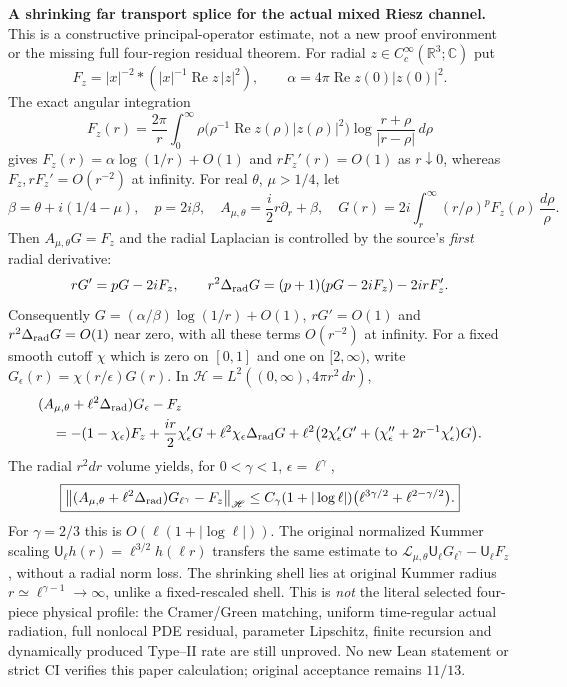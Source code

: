 
\par\medskip
\noindent\textbf{A shrinking far transport splice for the actual mixed Riesz channel.}
This is a constructive principal-operator estimate, not a new proof
environment or the missing full four-region residual theorem.
For radial $z\in C_c^\infty(\mathbb R^3;\mathbb C)$ put
\[
 F_z=|x|^{-2}*(|x|^{-1}\operatorname{Re}z\,|z|^2),
 \qquad \alpha=4\pi\operatorname{Re}z(0)|z(0)|^2.
\]
The exact angular integration
\[
 F_z(r)=\frac{2\pi}{r}\int_0^\infty
  \rho\bigl(\rho^{-1}\operatorname{Re}z(\rho)|z(\rho)|^2\bigr)
  \log\frac{r+\rho}{|r-\rho|}\,d\rho
\]
gives $F_z(r)=\alpha\log(1/r)+O(1)$ and $rF_z'(r)=O(1)$
as $r\downarrow0$, whereas $F_z,rF_z'=O(r^{-2})$ at infinity.
For real $\theta$, $\mu>1/4$, let
\[
 \beta=\theta+i(1/4-\mu),\quad p=2i\beta,\quad
 A_{\mu,\theta}=\frac i2r\partial_r+\beta,\quad
 G(r)=2i\int_r^\infty(r/\rho)^pF_z(\rho)\,\frac{d\rho}{\rho}.
\]
Then $A_{\mu,\theta}G=F_z$ and the radial Laplacian is
controlled by the source's \emph{first} radial derivative:
\[
 rG'=pG-2iF_z,\qquad
 r^2\Delta_{\rm rad}G=(p+1)(pG-2iF_z)-2irF_z'.
\]
Consequently $G= (\alpha/\beta)\log(1/r)+O(1)$,
$rG'=O(1)$ and $r^2\Delta_{\rm rad}G=O(1)$ near zero,
with all these terms $O(r^{-2})$ at infinity.
For a fixed smooth cutoff $\chi$ which is zero on $[0,1]$ and
one on $[2,\infty)$, write
$G_\epsilon(r)=\chi(r/\epsilon)G(r)$.
In $\mathscr H=L^2((0,\infty),4\pi r^2\,dr)$,
\[
 \begin{aligned}
 &(A_{\mu,\theta}+\ell^2\Delta_{\rm rad})G_\epsilon-F_z\\
 &\quad=-(1-\chi_\epsilon)F_z
    +\frac{ir}{2}\chi_\epsilon'G+
      \ell^2\chi_\epsilon\Delta_{\rm rad}G+
      \ell^2\bigl(2\chi_\epsilon'G'
       +(\chi_\epsilon''+2r^{-1}\chi_\epsilon')G\bigr).
 \end{aligned}
\]
The radial $r^2dr$ volume yields, for $0<\gamma<1$,
$\epsilon=\ell^\gamma$,
\[
 \boxed{
 \left\|(A_{\mu,\theta}+\ell^2\Delta_{\rm rad})
  G_{\ell^\gamma}-F_z\right\|_{\mathscr H}
 \le C_\gamma(1+|\log\ell|)
   \bigl(\ell^{3\gamma/2}+\ell^{2-\gamma/2}\bigr).
 }
\]
For $\gamma=2/3$ this is $O(\ell(1+|\log\ell|))$.
The original normalized Kummer scaling
$\mathsf U_\ell h(r)=\ell^{3/2}h(\ell r)$
transfers the same estimate to
$\mathcal L_{\mu,\theta}\mathsf U_\ell G_{\ell^\gamma}
-\mathsf U_\ell F_z$, without a radial norm loss.
The shrinking shell lies at original Kummer radius
$r\simeq\ell^{\gamma-1}\to\infty$, unlike a fixed-rescaled shell.
This is \emph{not} the literal selected four-piece physical profile:
the Cramer/Green matching, uniform time-regular actual radiation,
full nonlocal PDE residual, parameter Lipschitz, finite recursion and
dynamically produced Type--II rate are still unproved. No new Lean
statement or strict CI verifies this paper calculation; original
acceptance remains $11/13$.
